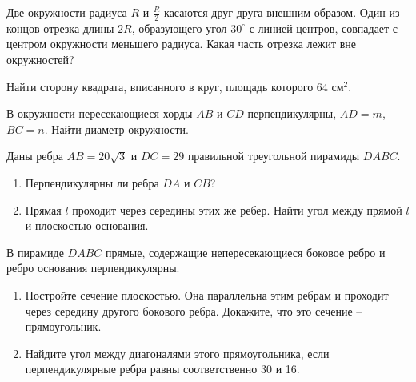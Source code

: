 \documentclass[geometry,a5paper]{pum}
\begin{document}
\begin{exercises}
  \begin{question}
    Две окружности радиуса $R$ и $\frac{R}{2}$ касаются друг друга внешним образом. Один из концов отрезка длины $2R$, образующего угол $30^\circ$ с линией центров, совпадает с центром окружности меньшего радиуса. Какая часть отрезка лежит вне окружностей?
  \end{question}
  \begin{question}
    Найти сторону квадрата, вписанного в круг, площадь которого 64 см$^2$.
  \end{question}
  \begin{question}
    В окружности пересекающиеся хорды $AB$ и $CD$ перпендикулярны, $AD=m$, $BC=n$. Найти диаметр окружности.
  \end{question}
  \begin{question}
    Даны ребра $AB=20\sqrt{3}$ и $DC=29$ правильной треугольной пирамиды $DABC$. 
    \begin{enumerate}[nosep,label=\asbuk*), ref=\asbuk*]
    \item Перпендикулярны ли ребра $DA$ и $CB$?
    \item Прямая $l$ проходит через середины этих же ребер. Найти угол между прямой $l$ и плоскостью основания.
  \end{enumerate}
\end{question}
  \begin{question}
    В пирамиде $DABC$ прямые, содержащие непересекающиеся боковое ребро и ребро основания перпендикулярны.
    \begin{enumerate}[nosep,label=\asbuk*), ref=\asbuk*]
    \item Постройте сечение плоскостью. Она параллельна этим ребрам и проходит через середину другого бокового ребра. Докажите, что это сечение -- прямоугольник.
    \item Найдите угол между диагоналями этого прямоугольника, если перпендикулярные ребра равны соответственно 30 и 16.
  \end{enumerate}
\end{question}


\end{exercises}
\end{document}
